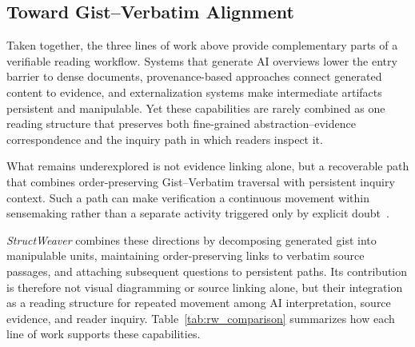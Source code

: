 \documentclass[manuscript,review,anonymous]{acmart}
\begin{document}
\subsection{Toward Gist--Verbatim Alignment}
\label{sec:gist-verbatim}

Taken together, the three lines of work above provide complementary parts of a verifiable reading workflow. Systems that generate AI overviews lower the entry barrier to dense documents, provenance-based approaches connect generated content to evidence, and externalization systems make intermediate artifacts persistent and manipulable. Yet these capabilities are rarely combined as one reading structure that preserves both fine-grained abstraction--evidence correspondence and the inquiry path in which readers inspect it.

What remains underexplored is not evidence linking alone, but a recoverable path that combines order-preserving Gist--Verbatim traversal with persistent inquiry context. Such a path can make verification a continuous movement within sensemaking rather than a separate activity triggered only by explicit doubt~\cite{pirolli2005sensemaking,vered2023}.

\textit{StructWeaver} combines these directions by decomposing generated gist into manipulable units, maintaining order-preserving links to verbatim source passages, and attaching subsequent questions to persistent paths. Its contribution is therefore not visual diagramming or source linking alone, but their integration as a reading structure for repeated movement among AI interpretation, source evidence, and reader inquiry. Table~\ref{tab:rw_comparison} summarizes how each line of work supports these capabilities.

\end{document}

